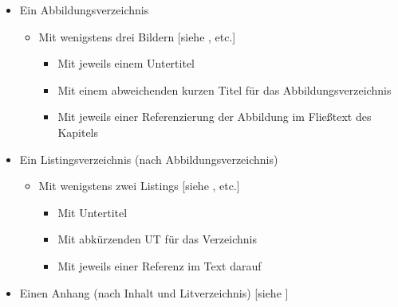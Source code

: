 \begin{itemize}
    \item Ein Abbildungsverzeichnis                                                     
    \begin{itemize}                                                                             
        \item Mit wenigstens drei Bildern       [siehe ,  etc.]                                                  
        \begin{itemize}                                                                         
            \item Mit jeweils einem Untertitel                                                  
            \item Mit einem abweichenden kurzen Titel für das Abbildungsverzeichnis             
            \item Mit jeweils einer Referenzierung der Abbildung im Fließtext des Kapitels      
        \end{itemize}                                                                           
    \end{itemize}                                                                               
    \item Ein Listingsverzeichnis (nach Abbildungsverzeichnis)                                  
        \begin{itemize}                                                                         
            \item Mit wenigstens zwei Listings   [siehe ,  etc.]                                               
                \begin{itemize}                                                                 
                    \item Mit Untertitel                                                        
                    \item Mit abkürzenden UT für das Verzeichnis                              
                    \item Mit jeweils einer Referenz im Text darauf                            
                \end{itemize}                                                                   
        \end{itemize}                                                                           
    \item Einen Anhang (nach Inhalt und Litverzeichnis)     [siehe ]                        

\end{itemize}
